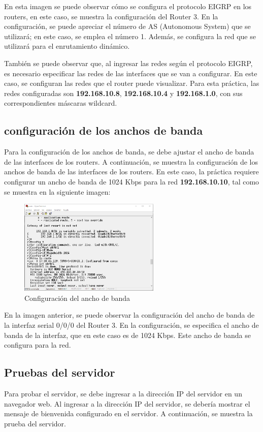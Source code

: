     En esta imagen se puede observar cómo se configura el protocolo EIGRP en los routers, en este caso, se muestra la configuración del Router 3. En la configuración, se puede apreciar el número de AS (Autonomous System) que se utilizará; en este caso, se emplea el número 1. Además, se configura la red que se utilizará para el enrutamiento dinámico.

    También se puede observar que, al ingresar las redes según el protocolo EIGRP, es necesario especificar las redes de las interfaces que se van a configurar. En este caso, se configuran las redes que el router puede visualizar. Para esta práctica, las redes configuradas son \textbf{192.168.10.8}, \textbf{192.168.10.4} y \textbf{192.168.1.0}, con sus correspondientes máscaras wildcard.
    
    \subsection{configuración de los anchos de banda}
    Para la configuración de los anchos de banda, se debe ajustar el ancho de banda de las interfaces de los routers. A continuación, se muestra la configuración de los anchos de banda de las interfaces de los routers.
    En este caso, la práctica requiere configurar un ancho de banda de 1024 Kbps para la red \textbf{192.168.10.10}, tal como se muestra en la siguiente imagen:
    \begin{figure}[H]
        \centering
        \includegraphics[width=0.6\textwidth]{img/bandwidth.png}
        \caption{Configuración del ancho de banda}
        \label{fig:bandwidth}
    \end{figure}
    En la imagen anterior, se puede observar la configuración del ancho de banda de la interfaz serial 0/0/0 del Router 3. En la configuración, se especifica el ancho de banda de la interfaz, que en este caso es de 1024 Kbps. Este ancho de banda se configura para la red.

    \subsection{Pruebas del servidor}
    Para probar el servidor, se debe ingresar a la dirección IP del servidor en un navegador web. Al ingresar a la dirección IP del servidor, se debería mostrar el mensaje de bienvenida configurado en el servidor. A continuación, se muestra la prueba del servidor.


